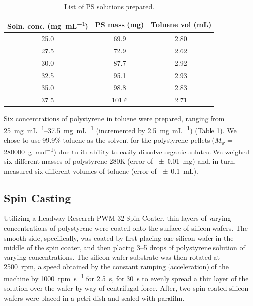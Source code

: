 \documentclass[twocolumn]{article}
\begin{document}
                \begin{table}
                    \centering
                    \caption{List of PS solutions prepared.}\label{tab:soln}
                    \begin{tabular}{@{}ccc@{}}
                        \toprule
                        Soln. conc. (\unit{\milli\gram\per\milli\liter}) & PS mass (\unit{\milli\gram}) & Toluene vol (\unit{\milli\liter}) \\ \midrule
                        25.0                           & 69.9                  & 2.80                \\
                        27.5                           & 72.9                  & 2.62                \\
                        30.0                           & 87.7                  & 2.92                \\
                        32.5                           & 95.1                  & 2.93                \\
                        35.0                           & 98.8                  & 2.83                \\
                        37.5                           & 101.6                 & 2.71                \\ \bottomrule
                    \end{tabular}
                \end{table}

                Six concentrations of polystyrene in toluene were prepared, ranging from \qtyrange{25}{37.5}{\milli\gram\per\milli\liter} (incremented by \qty{2.5}{\milli\gram\per\milli\liter}) (Table \ref{tab:soln}). We chose to use 99.9\% toluene as the solvent for the polystyrene pellets ($M_\text{w} = $ \qty{280000}{\gram\per\mol}) due to its ability to easily dissolve organic solutes. We weighed six different masses of polystyrene 280K (error of \qty{\pm 0.01}{\milli\gram}) and, in turn, measured six different volumes of toluene (error of \qty{\pm 0.1}{\milli\liter}).

            \subsection{Spin Casting}
                Utilizing a Headway Research PWM 32 Spin Coater, thin layers of varying concentrations of polystyrene were coated onto the surface of silicon wafers. The smooth side, specifically, was coated by first placing one silicon wafer in the middle of the spin coater, and then placing 3--5 drops of polystyrene solution of varying concentrations. The silicon wafer substrate was then rotated at \qty{2500}{rpm}, a speed obtained by the constant ramping (acceleration) of the machine by \qty{1000}{rpm\per\second} for \qty{2.5}{\second}, for \qty{30}{\second} to evenly spread a thin layer of the solution over the wafer by way of centrifugal force. After, two spin coated silicon wafers were placed in a petri dish and sealed with parafilm.
\end{document}

